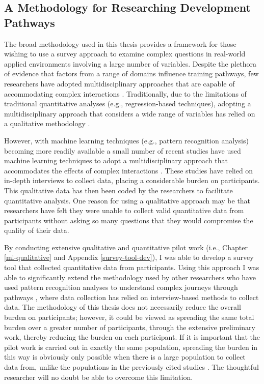 \documentclass[
  12pt,
  a4paper,
]{book}
\begin{document}
\hypertarget{a-methodology-for-researching-development-pathways}{%
\subsection{A Methodology for Researching Development Pathways}\label{a-methodology-for-researching-development-pathways}}

The broad methodology used in this thesis provides a framework for those wishing to use a survey approach to examine complex questions in real-world applied environments involving a large number of variables. Despite the plethora of evidence that factors from a range of domains influence training pathways, few researchers have adopted multidisciplinary approaches that are capable of accommodating complex interactions \citep[cf.~][]{Rees2016, Gullich2019}. Traditionally, due to the limitations of traditional quantitative analyses (e.g., regression-based techniques), adopting a multidisciplinary approach that considers a wide range of variables has relied on a qualitative methodology \citep[e.g.,][]{Hardy2017}.

However, with machine learning techniques (e.g., pattern recognition analysis) becoming more readily available a small number of recent studies have used machine learning techniques to adopt a multidisciplinary approach that accommodates the effects of complex interactions \citep[e.g.,][]{Gullich2019, Jones2019a, Jones2020}. These studies have relied on in-depth interviews to collect data, placing a considerable burden on participants. This qualitative data has then been coded by the researchers to facilitate quantitative analysis. One reason for using a qualitative approach may be that researchers have felt they were unable to collect valid quantitative data from participants without asking so many questions that they would compromise the quality of their data.

By conducting extensive qualitative and quantitative pilot work (i.e., Chapter \ref{ml-qualitative} and Appendix \ref{survey-tool-dev}), I was able to develop a survey tool that collected quantitative data from participants. Using this approach I was able to significantly extend the methodology used by other researchers who have used pattern recognition analyses to understand complex journeys through pathways \citep[e.g.,][]{Jones2019a, Jones2020, Gullich2019}, where data collection has relied on interview-based methods to collect data. The methodology of this thesis does not necessarily reduce the overall burden on participants; however, it could be viewed as spreading the same total burden over a greater number of participants, through the extensive preliminary work, thereby reducing the burden on each participant. If it is important that the pilot work is carried out in exactly the same population, spreading the burden in this way is obviously only possible when there is a large population to collect data from, unlike the populations in the previously cited studies \citep[i.e.,][]{Gullich2019, Jones2019a, Jones2020}. The thoughtful researcher will no doubt be able to overcome this limitation.
\end{document}
